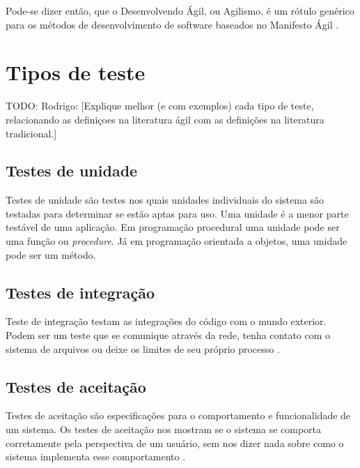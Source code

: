 Pode-se dizer então, que o Desenvolvendo Ágil, ou Agilismo, é um rótulo genérico para os métodos de desenvolvimento de software baseados no Manifesto Ágil \cite{BDDRodrigo}.



\section{Tipos de teste}
\label{sec:tipos_de_teste}

TODO: Rodrigo: [Explique melhor (e com exemplos) cada tipo de teste, relacionando as definiçoes na literatura ágil com as definições na literatura tradicional.]

\subsection{Testes de unidade}
\label{sub:testes_de_unidade}

Testes de unidade são testes nos quais unidades individuais do sistema são testadas para determinar se estão aptas para uso. Uma unidade é a menor parte testável de uma aplicação. Em programação procedural uma unidade pode ser uma função ou \textit{procedure}. Já em programação orientada a objetos, uma unidade pode ser um método.


\subsection{Testes de integração}
\label{sub:testes_de_integracao}

Teste de integração testam as integrações do código com o mundo exterior. Podem ser um teste que se comunique através da rede, tenha contato com o sistema de arquivos ou deixe os limites de seu próprio processo \cite{ArtOfAgileDevelopment}.


\subsection{Testes de aceitação}
\label{sub:testes_de_aceitacao}

Testes de aceitação são especificações para o comportamento e funcionalidade de um sistema. Os testes de aceitação nos mostram se o sistema se comporta corretamente pela perspectiva de um usuário, sem nos dizer nada sobre como o sistema implementa esse comportamento \cite{TestDrivenKoskela}.


